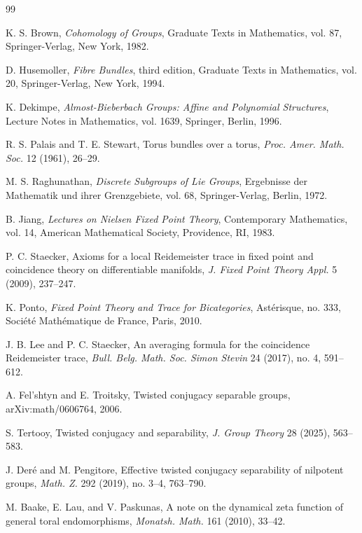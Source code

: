 \documentclass[11pt]{article}
\begin{document}
\begin{thebibliography}{99}
\small

K. S. Brown,
\emph{Cohomology of Groups},
Graduate Texts in Mathematics, vol. 87,
Springer-Verlag, New York, 1982.

D. Husemoller,
\emph{Fibre Bundles}, third edition,
Graduate Texts in Mathematics, vol. 20,
Springer-Verlag, New York, 1994.

K. Dekimpe,
\emph{Almost-Bieberbach Groups: Affine and Polynomial Structures},
Lecture Notes in Mathematics, vol. 1639,
Springer, Berlin, 1996.

R. S. Palais and T. E. Stewart,
Torus bundles over a torus,
\emph{Proc. Amer. Math. Soc.} 12 (1961), 26--29.

M. S. Raghunathan,
\emph{Discrete Subgroups of Lie Groups},
Ergebnisse der Mathematik und ihrer Grenzgebiete, vol. 68,
Springer-Verlag, Berlin, 1972.

B. Jiang,
\emph{Lectures on Nielsen Fixed Point Theory},
Contemporary Mathematics, vol. 14,
American Mathematical Society, Providence, RI, 1983.

P. C. Staecker,
Axioms for a local Reidemeister trace in fixed point and coincidence theory
on differentiable manifolds,
\emph{J. Fixed Point Theory Appl.} 5 (2009), 237--247.

K. Ponto,
\emph{Fixed Point Theory and Trace for Bicategories},
Ast\'erisque, no. 333,
Soci\'et\'e Math\'ematique de France, Paris, 2010.

J. B. Lee and P. C. Staecker,
An averaging formula for the coincidence Reidemeister trace,
\emph{Bull. Belg. Math. Soc. Simon Stevin} 24 (2017), no. 4, 591--612.

A. Fel'shtyn and E. Troitsky,
Twisted conjugacy separable groups,
arXiv:math/0606764, 2006.

S. Tertooy,
Twisted conjugacy and separability,
\emph{J. Group Theory} 28 (2025), 563--583.

J. Der\'e and M. Pengitore,
Effective twisted conjugacy separability of nilpotent groups,
\emph{Math. Z.} 292 (2019), no. 3--4, 763--790.

M. Baake, E. Lau, and V. Paskunas,
A note on the dynamical zeta function of general toral endomorphisms,
\emph{Monatsh. Math.} 161 (2010), 33--42.


\end{thebibliography}
\end{document}
